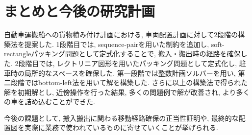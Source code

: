 \chapter{まとめと今後の研究計画}\label{conclution}
自動車運搬船への貨物積み付け計画における, 車両配置計画に対して2段階の構築法を提案した. 
1段階目では, sequence-pairを用いた制約を追加し, soft-rectangleパッキング問題として定式化することで, 搬入・搬出時の経路を確保した.  
2段階目では, レクトリニア図形を用いたパッキング問題として定式化し, 駐車時の局所的なスペースを確保した. 
第一段階では整数計画ソルバーを用い, 第二段階ではbottom-left法を用いて解を構築した. 
さらに以上の構築法で得られた解を初期解とし, 近傍操作を行った結果, 多くの問題例で解が改善され, より多くの車を詰め込むことができた. 

今後の課題として, 搬入搬出に関わる移動経路確保の正当性証明や, 最終的な配置図を実際に業務で使われているものに寄せていくことが挙げられる. 
